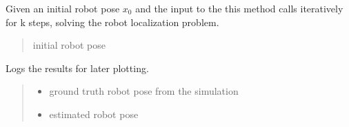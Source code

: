 \documentclass[letterpaper,10pt,english]{sphinxmanual}
\begin{document}
\begin{fulllineitems}

\begin{fulllineitems}
\label{\detokenize{Localization:Localization.Localization.LocalizationLoop}}
\pysigstartsignatures
{}
\pysigstopsignatures
\sphinxAtStartPar
Given an initial robot pose \(x_0\) and the input to the  this method calls iteratively  for k steps, solving the robot localization problem.
\begin{quote}\begin{description}
\sphinxAtStartPar
{} \textendash{} initial robot pose

\end{description}\end{quote}

\end{fulllineitems}


\begin{fulllineitems}
\label{\detokenize{Localization:Localization.Localization.Log}}
\pysigstartsignatures
{}
\pysigstopsignatures
\sphinxAtStartPar
Logs the results for later plotting.
\begin{quote}\begin{description}
\begin{itemize}
\item {} 
\sphinxAtStartPar
{} \textendash{} ground truth robot pose from the simulation

\item {} 
\sphinxAtStartPar
{} \textendash{} estimated robot pose

\end{itemize}

\end{description}\end{quote}


\end{fulllineitems}
\end{fulllineitems}
\end{document}
